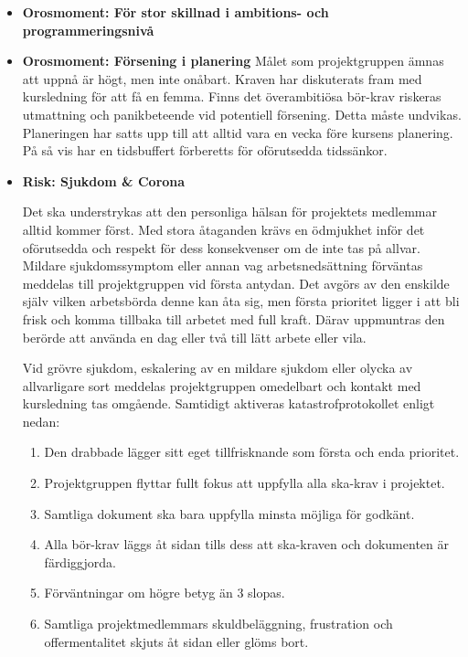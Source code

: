 \documentclass{mall}
\begin{document}
\begin{itemize}

\item \textbf{Orosmoment: För stor skillnad i ambitions- och programmeringsnivå}




\item \textbf{Orosmoment: Försening i planering}
  Målet som projektgruppen ämnas att uppnå är högt, men inte onåbart. Kraven har diskuterats fram med kursledning för att få en femma. Finns det överambitiösa bör-krav riskeras utmattning och panikbeteende vid potentiell försening. Detta måste undvikas. Planeringen har satts upp till att alltid vara en vecka före kursens planering. På så vis har en tidsbuffert förberetts för oförutsedda tidssänkor. 




\item \textbf{Risk: Sjukdom \& Corona}

  Det ska understrykas att den personliga hälsan för projektets medlemmar alltid kommer först. Med stora åtaganden krävs en ödmjukhet inför det oförutsedda och respekt för dess konsekvenser om de inte tas på allvar. Mildare sjukdomssymptom eller annan vag arbetsnedsättning förväntas meddelas till projektgruppen vid första antydan. Det avgörs av den enskilde själv vilken arbetsbörda denne kan åta sig, men första prioritet ligger i att bli frisk och komma tillbaka till arbetet med full kraft. Därav uppmuntras den berörde att använda en dag eller två till lätt arbete eller vila.

  Vid grövre sjukdom, eskalering av en mildare sjukdom eller olycka av allvarligare sort meddelas projektgruppen omedelbart och kontakt med kursledning tas omgående. Samtidigt aktiveras katastrofprotokollet enligt nedan:
  \begin{enumerate}
  \item Den drabbade lägger sitt eget tillfrisknande som första och enda prioritet.
  \item Projektgruppen flyttar fullt fokus att uppfylla alla ska-krav i projektet.
  \item Samtliga dokument ska bara uppfylla minsta möjliga för godkänt.
  \item Alla bör-krav läggs åt sidan tills dess att ska-kraven och dokumenten är färdiggjorda.
  \item Förväntningar om högre betyg än 3 slopas.
  \item Samtliga projektmedlemmars skuldbeläggning, frustration och offermentalitet skjuts åt sidan eller glöms bort.
  \end{enumerate}
  

\end{itemize}
\end{document}

